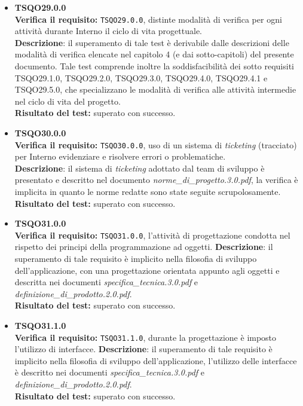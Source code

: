 \begin{itemize}
\item \textbf{TSQO29.0.0}\\
\textbf{Verifica il requisito:} \texttt{TSQO29.0.0}, distinte modalità di verifica per ogni attività durante Interno il ciclo di vita progettuale.\\
\textbf{Descrizione}: il superamento di tale test è derivabile dalle descrizioni delle modalità di verifica elencate nel capitolo 4 (e dai sotto-capitoli) del presente documento. Tale test comprende inoltre la soddisfacibilità dei sotto requisiti TSQO29.1.0, TSQO29.2.0, TSQO29.3.0, TSQO29.4.0, TSQO29.4.1 e TSQO29.5.0, che specializzano le modalità di verifica alle attività intermedie nel ciclo di vita del progetto.\\
\textbf{Risultato del test:} superato con successo.

\item \textbf{TSQO30.0.0}\\
\textbf{Verifica il requisito:} \texttt{TSQO30.0.0}, uso di un sistema di \textit{ticketing} (tracciato) per Interno evidenziare e risolvere errori o problematiche.\\
\textbf{Descrizione}: il sistema di \textit{ticketing} adottato dal team di sviluppo è presentato e descritto nel documento \textit{norme\_di\_progetto.3.0.pdf}, la verifica è implicita in quanto le norme redatte sono state seguite scrupolosamente.\\
\textbf{Risultato del test:} superato con successo.

\item \textbf{TSQO31.0.0}\\
\textbf{Verifica il requisito:} \texttt{TSQO31.0.0}, l'attività di progettazione condotta nel rispetto dei principi della programmazione ad oggetti.
\textbf{Descrizione}: il superamento di tale requisito è implicito nella filosofia di sviluppo dell'applicazione, con una progettazione orientata appunto agli oggetti e descritta nei documenti \textit{specifica\_tecnica.3.0.pdf} e \textit{definizione\_di\_prodotto.2.0.pdf}.\\
\textbf{Risultato del test:} superato con successo.

\item \textbf{TSQO31.1.0}\\
\textbf{Verifica il requisito:} \texttt{TSQO31.1.0}, durante la progettazione è imposto l'utilizzo di interfacce.
\textbf{Descrizione}: il superamento di tale requisito è implicito nella filosofia di sviluppo dell'applicazione, l'utilizzo delle interfacce è descritto nei documenti \textit{specifica\_tecnica.3.0.pdf} e \textit{definizione\_di\_prodotto.2.0.pdf}.\\
\textbf{Risultato del test:} superato con successo.


\end{itemize}
